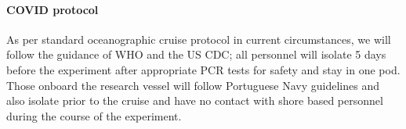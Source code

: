 \paragraph{COVID protocol} As per standard oceanographic cruise
protocol in current circumstances, we will follow the guidance of WHO
and the US CDC; all personnel will isolate 5 days before the
experiment after appropriate PCR tests for safety and stay in one
pod. Those onboard the \inst research vessel will follow Portuguese
Navy guidelines and also isolate prior to the cruise and have no
contact with shore based personnel during the course of the
experiment.
